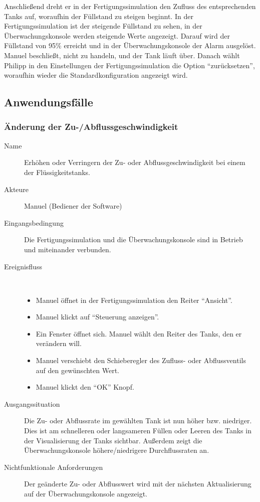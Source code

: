 \documentclass[parskip=full]{scrartcl}
\begin{document}
Anschlie{\ss}end dreht er in der Fertigungssimulation den Zufluss des entsprechenden Tanks auf, woraufhin der F\"ullstand
zu steigen beginnt. In der Fertigungssimulation ist der steigende F\"ullstand zu sehen, in der \"Uberwachungskonsole werden
steigende Werte angezeigt.
Darauf wird der F\"ullstand von 95\% erreicht und in der \"Uberwachungskonsole der Alarm ausgel\"ost. Manuel
beschlie{\ss}t, nicht zu handeln, und der Tank l\"auft \"uber. Danach w\"ahlt Philipp in den Einstellungen der
Fertigungssimulation die Option ``zur\"ucksetzen'', woraufhin wieder die Standardkonfiguration angezeigt wird.

\subsection{Anwendungsfälle}
\subsubsection{Änderung der Zu-/Abflussgeschwindigkeit}
\begin{description}
 \item[Name] Erhöhen oder Verringern der Zu- oder Abflussgeschwindigkeit bei einem der Flüssigkeitstanks.
 \item[Akteure] Manuel (Bediener der Software)
 \item[Eingangsbedingung] Die Fertigungssimulation und die Überwachungskonsole sind in Betrieb und miteinander verbunden.
 \item[Ereignisfluss]~\\
 \begin{itemize}[noitemsep]
  \item Manuel öffnet in der Fertigungssimulation den Reiter ``Ansicht''.
  \item Manuel klickt auf ``Steuerung anzeigen''.
  \item Ein Fenster öffnet sich. Manuel wählt den Reiter des Tanks, den er verändern will.
  \item Manuel verschiebt den Schieberegler des Zufluss- oder Abflussventils auf den gewünschten Wert.
  \item Manuel klickt den ``OK'' Knopf.
 \end{itemize}
 \item[Ausgangssituation] Die Zu- oder Abflussrate im gewählten Tank ist nun höher bzw. niedriger. Dies ist am schnelleren oder langsameren Füllen oder Leeren des Tanks in der Visualisierung der Tanks sichtbar.
 Außerdem zeigt die Überwachungskonsole höhere/niedrigere Durchflussraten an.
 \item [Nichtfunktionale Anforderungen] Der geänderte Zu- oder Abflusswert wird mit der nächsten Aktualisierung auf der Überwachungskonsole angezeigt.
\end{description}
\end{document}
